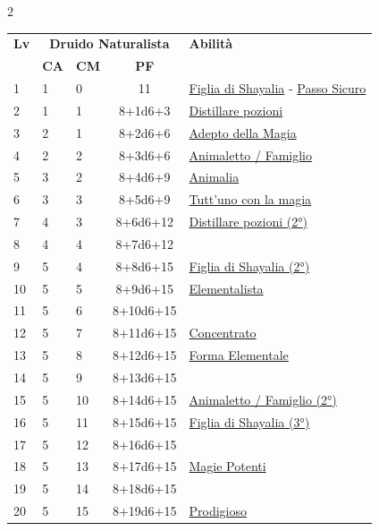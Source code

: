 {\begin{multicols}{2}

\noindent\begin{tabularx}{\linewidth}{p{0.55cm}|p{0.55cm}p{0.55cm}c|X|}
	\toprule
 \rowcolor{gray!20}	\textbf{Lv} & \multicolumn{3}{c|}{\textbf{Druido Naturalista}} & \textbf{Abilità} \\
& \centering\arraybackslash \textbf{CA} & \centering\arraybackslash \textbf{CM} & \centering\arraybackslash \textbf{PF} & \\
	\toprule
	1 & 1 & 0 & 11 & \hyperlink{Figlia di Shayalia}{Figlia di Shayalia} - \hyperlink{Passo Sicuro}{Passo Sicuro}\\
	\rowcolor{gray!20}2 & 1 & 1 & 8+1d6+3 & \hyperlink{Distillare pozioni}{Distillare pozioni}\\
	3 & 2 & 1 & 8+2d6+6 & \hyperlink{Adepto della Magia}{Adepto della Magia}\\
	\rowcolor{gray!20}4 & 2 & 2 & 8+3d6+6 & \hyperlink{Animaletto / Famiglio}{Animaletto / Famiglio}\\
	5 & 3 & 2 & 8+4d6+9 & \hyperlink{Animalia}{Animalia}\\
	\rowcolor{gray!20}6 & 3 & 3 & 8+5d6+9 & \hyperlink{Tutt'uno con la magia}{Tutt'uno con la magia}\\
	7 & 4 & 3 & 8+6d6+12 & \hyperlink{Distillare pozioni}{Distillare pozioni (2°)}\\
	\rowcolor{gray!20}8 & 4 & 4 & 8+7d6+12 & \\
	9 & 5 & 4 & 8+8d6+15 & \hyperlink{Figlia di Shayalia}{Figlia di Shayalia (2°)}\\
	\rowcolor{gray!20}10 & 5 & 5 & 8+9d6+15 & \hyperlink{Elementalista}{Elementalista}\\
	11 & 5 & 6 & 8+10d6+15 & \\
	\rowcolor{gray!20}12 & 5 & 7 & 8+11d6+15 & \hyperlink{Concentrato}{Concentrato}\\
	13 & 5 & 8 & 8+12d6+15 & \hyperlink{Forma Elementale}{Forma Elementale}\\
	\rowcolor{gray!20}14 & 5 & 9 & 8+13d6+15 & \\
	15 & 5 & 10 & 8+14d6+15 & \hyperlink{Animaletto / Famiglio}{Animaletto / Famiglio (2°)}\\
	\rowcolor{gray!20}16 & 5 & 11 & 8+15d6+15 & \hyperlink{Figlia di Shayalia}{Figlia di Shayalia (3°)}\\
	17 & 5 & 12 & 8+16d6+15 & \\
	\rowcolor{gray!20}18 & 5 & 13 & 8+17d6+15 & \hyperlink{Magie Potenti}{Magie Potenti}\\
	19 & 5 & 14 & 8+18d6+15 & \\
	\rowcolor{gray!20}20 & 5 & 15 & 8+19d6+15 & \hyperlink{Prodigioso}{Prodigioso}\\
\end{tabularx}


\end{multicols}}
